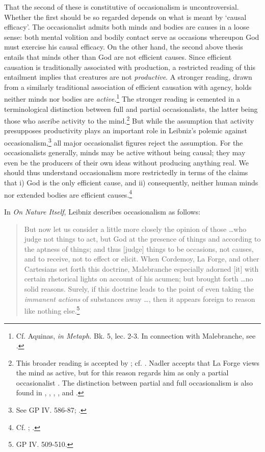 \documentclass{article}
\begin{document}
That the second of these is constitutive of occasionalism is
uncontroversial. Whether the first should be so regarded depends on what
is meant by `causal efficacy'. The occasionalist admits both minds and
bodies are causes in a loose sense: both mental volition and bodily
contact serve as occasions whereupon God must exercise his causal
efficacy. On the other hand, the second above thesis entails that minds
other than God are not efficient causes. Since efficient causation is
traditionally associated with production, a restricted reading of this
entailment implies that creatures are not \emph{productive}. A stronger
reading, drawn from a similarly traditional association of efficient
causation with agency, holds neither minds nor bodies are
\emph{active.}\footnote{Cf. Aquinas, \emph{in Metaph.} Bk. 5, lec. 2-3.
  In connection with Malebranche, see \autocite[255-256]{Baker2005}.} The stronger
reading is cemented in a terminological distinction between full and
partial occasionalists, the latter being those who ascribe activity to
the mind.\footnote{This broader reading is accepted by \autocite{Nadler2005}; cf.
  \autocite[288]{Winkler2011}. Nadler accepts that La Forge views the mind as
  active, but for this reason regards him as only a partial
  occasionalist \autocite[227]{Nadler1998}. The distinction between partial and
  full occasionalism is also found in \autocite{Radner1993}, \autocite{Garber1987}, \autocite{Clarke2000}, \autocite{Bardout2002}, and \autocite{Kolesnik2006}.} But while the
assumption that activity presupposes productivity plays an important
role in Leibniz's polemic against occasionalism,\footnote{See GP IV.
  586-87; \autocite{Rutherford1993}.} all major occasionalist figures reject the
assumption. For the occasionalists generally, minds may be active
without being causal; they may even be the producers of their own ideas
without producing anything real. We should thus understand occasionalism
more restrictedly in terms of the claims that i) God is the only
efficient cause, and ii) consequently, neither human minds nor extended
bodies are efficient causes.\footnote{Cf. \autocite[625-626]{Platt2011}; \autocite[101]{Gouhier1926}.}

In \emph{On Nature Itself}, Leibniz describes occasionalism as follows:

\begin{quote}
But now let us consider a little more closely the opinion of those
\ldots who judge not things to act, but God at the presence of
things and according to the aptness of things; and thus {[}judge{]}
things to be occasions, not causes, and to receive, not to effect or
elicit. When Cordemoy, La Forge, and other Cartesians set forth this
doctrine, Malebranche especially adorned {[}it{]} with certain
rhetorical lights on account of his acumen; but brought forth
\ldots no solid reasons. Surely, if this doctrine leads to the
point of even taking the \emph{immanent actions} of substances away
\ldots, then it appears foreign to reason like nothing
else.\footnote{GP IV. 509-510.}
\end{quote}
\end{document}
